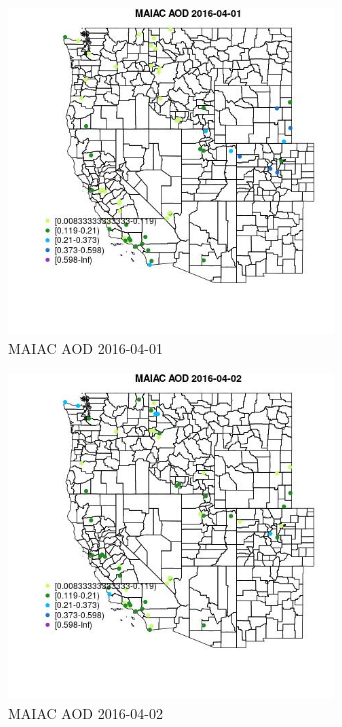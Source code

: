 \begin{figure} 
\centering  
\includegraphics[width=0.77\textwidth]{Code_Outputs/Report_ML_input_PM25_Step4_part_e_de_duplicated_aveswNAs_MapObsMAIAC_AOD2016-04-01.jpg} 
\caption{\label{fig:Report_ML_input_PM25_Step4_part_e_de_duplicated_aveswNAsMapObsMAIAC_AOD2016-04-01}MAIAC AOD 2016-04-01} 
\end{figure} 
 

\begin{figure} 
\centering  
\includegraphics[width=0.77\textwidth]{Code_Outputs/Report_ML_input_PM25_Step4_part_e_de_duplicated_aveswNAs_MapObsMAIAC_AOD2016-04-02.jpg} 
\caption{\label{fig:Report_ML_input_PM25_Step4_part_e_de_duplicated_aveswNAsMapObsMAIAC_AOD2016-04-02}MAIAC AOD 2016-04-02} 
\end{figure} 
 

